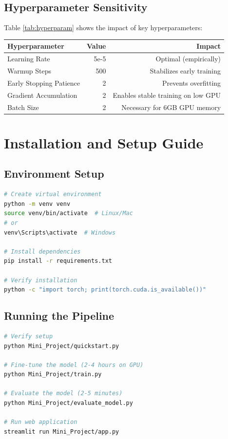 \documentclass[12pt,a4paper,oneside]{report}
\begin{document}
\section{Hyperparameter Sensitivity}
Table \ref{tab:hyperparam} shows the impact of key hyperparameters:

\begin{table}[H]
\centering
\begin{tabular}{lrr}
\toprule
\textbf{Hyperparameter} & \textbf{Value} & \textbf{Impact} \\
\midrule
Learning Rate & 5e-5 & Optimal (empirically) \\
Warmup Steps & 500 & Stabilizes early training \\
Early Stopping Patience & 2 & Prevents overfitting \\
Gradient Accumulation & 2 & Enables stable training on low GPU \\
Batch Size & 2 & Necessary for 6GB GPU memory \\
\bottomrule
\end{tabular}
\end{table}

\chapter{Installation and Setup Guide}
\label{app:setup}

\section{Environment Setup}
\begin{lstlisting}[language=bash]
# Create virtual environment
python -m venv venv
source venv/bin/activate  # Linux/Mac
# or
venv\Scripts\activate  # Windows

# Install dependencies
pip install -r requirements.txt

# Verify installation
python -c "import torch; print(torch.cuda.is_available())"
\end{lstlisting}

\section{Running the Pipeline}
\begin{lstlisting}[language=bash]
# Verify setup
python Mini_Project/quickstart.py

# Fine-tune the model (2-4 hours on GPU)
python Mini_Project/train.py

# Evaluate the model (2-5 minutes)
python Mini_Project/evaluate_model.py

# Run web application
streamlit run Mini_Project/app.py
\end{lstlisting}
\end{document}
